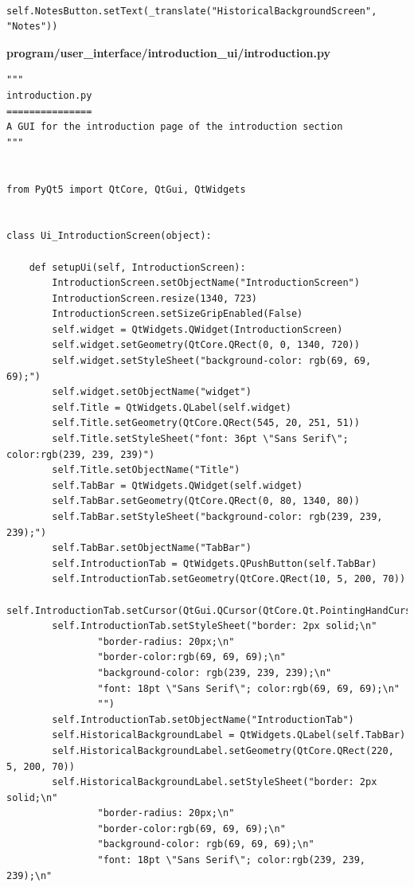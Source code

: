 \documentclass{article}
\begin{document}
\begin{lstlisting}
        self.NotesButton.setText(_translate("HistoricalBackgroundScreen", "Notes"))
\end{lstlisting}

\textbf{program/user\_interface/introduction\_ui/introduction.py}

\begin{lstlisting}
"""
introduction.py
===============
A GUI for the introduction page of the introduction section
"""


from PyQt5 import QtCore, QtGui, QtWidgets


class Ui_IntroductionScreen(object):

    def setupUi(self, IntroductionScreen):
        IntroductionScreen.setObjectName("IntroductionScreen")
        IntroductionScreen.resize(1340, 723)
        IntroductionScreen.setSizeGripEnabled(False)
        self.widget = QtWidgets.QWidget(IntroductionScreen)
        self.widget.setGeometry(QtCore.QRect(0, 0, 1340, 720))
        self.widget.setStyleSheet("background-color: rgb(69, 69, 69);")
        self.widget.setObjectName("widget")
        self.Title = QtWidgets.QLabel(self.widget)
        self.Title.setGeometry(QtCore.QRect(545, 20, 251, 51))
        self.Title.setStyleSheet("font: 36pt \"Sans Serif\"; color:rgb(239, 239, 239)")
        self.Title.setObjectName("Title")
        self.TabBar = QtWidgets.QWidget(self.widget)
        self.TabBar.setGeometry(QtCore.QRect(0, 80, 1340, 80))
        self.TabBar.setStyleSheet("background-color: rgb(239, 239, 239);")
        self.TabBar.setObjectName("TabBar")
        self.IntroductionTab = QtWidgets.QPushButton(self.TabBar)
        self.IntroductionTab.setGeometry(QtCore.QRect(10, 5, 200, 70))
        self.IntroductionTab.setCursor(QtGui.QCursor(QtCore.Qt.PointingHandCursor))
        self.IntroductionTab.setStyleSheet("border: 2px solid;\n"
                "border-radius: 20px;\n"
                "border-color:rgb(69, 69, 69);\n"
                "background-color: rgb(239, 239, 239);\n"
                "font: 18pt \"Sans Serif\"; color:rgb(69, 69, 69);\n"
                "")
        self.IntroductionTab.setObjectName("IntroductionTab")
        self.HistoricalBackgroundLabel = QtWidgets.QLabel(self.TabBar)
        self.HistoricalBackgroundLabel.setGeometry(QtCore.QRect(220, 5, 200, 70))
        self.HistoricalBackgroundLabel.setStyleSheet("border: 2px solid;\n"
                "border-radius: 20px;\n"
                "border-color:rgb(69, 69, 69);\n"
                "background-color: rgb(69, 69, 69);\n"
                "font: 18pt \"Sans Serif\"; color:rgb(239, 239, 239);\n"

\end{lstlisting}
\end{document}
